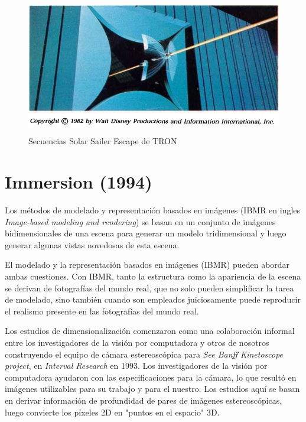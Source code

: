 \documentclass[a4paper,12pt]{report}
\begin{document}
 
\begin{figure}[ht]
    \centering
    \includegraphics[height=6cm]{Imagenes/tron}
    \caption{Secuencias Solar Sailer Escape de TRON}
    \label{fig:tron}
\end{figure}
 
 
 
\section{Immersion (1994)}
 
Los métodos de modelado y representación basados en imágenes 
(IBMR en ingles \textit{Image-based modeling and rendering}) se basan en un conjunto de imágenes bidimensionales 
de una escena para generar un modelo tridimensional 
y luego generar algunas vistas novedosas de esta escena.
 
 
El modelado y la representación basados en imágenes (IBMR) pueden abordar ambas
cuestiones. Con IBMR, tanto la estructura como la apariencia de la escena se derivan de
fotografías del mundo real, que no solo pueden simplificar la tarea de modelado, sino también cuando son
empleados juiciosamente puede reproducir el realismo presente en las fotografías del mundo real. \cite{IBMR}
 

Los estudios de dimensionalización comenzaron como una colaboración informal entre los investigadores de la visión por computadora y otros de nosotros
construyendo el equipo de cámara estereoscópica para \textit{See Banff Kinetoscope project}, en \textit{Interval Research} en 1993. Los investigadores de la visión por computadora ayudaron con las
especificaciones para la cámara, lo que resultó en imágenes utilizables para su trabajo y para el nuestro. 
Los estudios aquí se basan en derivar información de profundidad de pares de imágenes estereoscópicas,
luego convierte los píxeles 2D en "puntos en el espacio" 3D.\cite{immersion}
 

\newpage
 
\end{document}
